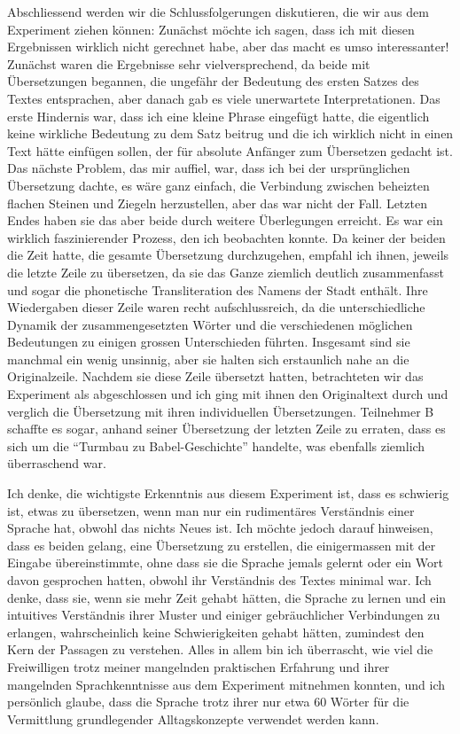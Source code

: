 \documentclass{article}
\begin{document}
Abschliessend werden wir die Schlussfolgerungen diskutieren, die wir aus dem Experiment ziehen können:
Zunächst möchte ich sagen, dass ich mit diesen Ergebnissen wirklich nicht gerechnet habe, aber das macht
es umso interessanter! Zunächst waren die Ergebnisse sehr vielversprechend, da beide mit Übersetzungen
begannen, die ungefähr der Bedeutung des ersten Satzes des Textes entsprachen, aber danach gab es viele
unerwartete Interpretationen. Das erste Hindernis war, dass ich eine kleine Phrase eingefügt hatte,
die eigentlich keine wirkliche Bedeutung zu dem Satz beitrug und die ich wirklich nicht in einen Text hätte
einfügen sollen, der für absolute Anfänger zum Übersetzen gedacht ist. Das nächste Problem, das mir auffiel,
war, dass ich bei der ursprünglichen Übersetzung dachte, es wäre ganz einfach, die Verbindung zwischen
beheizten flachen Steinen und Ziegeln herzustellen, aber das war nicht der Fall. Letzten Endes haben
sie das aber beide durch weitere Überlegungen erreicht. Es war ein wirklich faszinierender Prozess,
den ich beobachten konnte. Da keiner der beiden die Zeit hatte, die gesamte Übersetzung durchzugehen,
empfahl ich ihnen, jeweils die letzte Zeile zu übersetzen, da sie das Ganze ziemlich deutlich zusammenfasst
und sogar die phonetische Transliteration des Namens der Stadt enthält. Ihre Wiedergaben dieser Zeile waren
recht aufschlussreich, da die unterschiedliche Dynamik der zusammengesetzten Wörter und die verschiedenen
möglichen Bedeutungen zu einigen grossen Unterschieden führten. Insgesamt sind sie manchmal ein wenig unsinnig,
aber sie halten sich erstaunlich nahe an die Originalzeile. Nachdem sie diese Zeile übersetzt hatten,
betrachteten wir das Experiment als abgeschlossen und ich ging mit ihnen den Originaltext durch und
verglich die Übersetzung mit ihren individuellen Übersetzungen. Teilnehmer B schaffte es sogar,
anhand seiner Übersetzung der letzten Zeile zu erraten, dass es sich um die ``Turmbau zu Babel-Geschichte''
handelte, was ebenfalls ziemlich überraschend war.

Ich denke, die wichtigste Erkenntnis aus diesem Experiment ist, dass es schwierig ist, etwas zu übersetzen,
wenn man nur ein rudimentäres Verständnis einer Sprache hat, obwohl das nichts Neues ist.
Ich möchte jedoch darauf hinweisen, dass es beiden gelang, eine Übersetzung zu erstellen,
die einigermassen mit der Eingabe übereinstimmte, ohne dass sie die Sprache jemals gelernt oder ein Wort
davon gesprochen hatten, obwohl ihr Verständnis des Textes minimal war. Ich denke, dass sie,
wenn sie mehr Zeit gehabt hätten, die Sprache zu lernen und ein intuitives Verständnis ihrer Muster und
einiger gebräuchlicher Verbindungen zu erlangen, wahrscheinlich keine Schwierigkeiten gehabt hätten,
zumindest den Kern der Passagen zu verstehen. Alles in allem bin ich überrascht, wie viel die Freiwilligen
trotz meiner mangelnden praktischen Erfahrung und ihrer mangelnden Sprachkenntnisse aus dem Experiment
mitnehmen konnten, und ich persönlich glaube, dass die Sprache trotz ihrer nur etwa 60 Wörter für die Vermittlung
grundlegender Alltagskonzepte verwendet werden kann.
\end{document}
